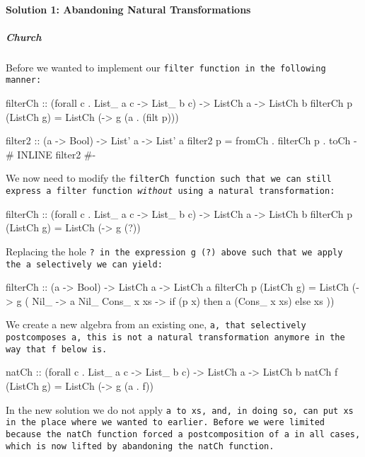 \paragraph{Solution 1: Abandoning Natural Transformations}
\subparagraph{Church} Before we wanted to implement our \tt{filter} function in the following manner:
\begin{spec}
filterCh :: (forall c . List_ a c -> List_ b c) -> ListCh a -> ListCh b
filterCh p (ListCh g) = ListCh (\a -> g (a . (filt p)))
\end{spec}
\begin{code}
filter2 :: (a -> Bool) -> List' a -> List' a
filter2 p = fromCh . filterCh p . toCh
{-# INLINE filter2 #-}
\end{code}
We now need to modify the \tt{filterCh} function such that we can still express a filter function \textit{without} using a natural transformation:
\begin{spec}
filterCh :: (forall c . List_ a c -> List_ b c) -> ListCh a -> ListCh b
filterCh p (ListCh g) = ListCh (\a -> g (?))
\end{spec}
Replacing the hole \tt{?} in the expression \tt{g (?)} above such that we apply the \tt{a} selectively we can yield:
\begin{code}
filterCh :: (a -> Bool) -> ListCh a -> ListCh a
filterCh p (ListCh g) = ListCh (\a -> g (\case
    Nil_ -> a Nil_
    Cons_ x xs -> if (p x) then a (Cons_ x xs) else xs
  ))
\end{code}
We create a new algebra from an existing one, \tt{a}, that selectively postcomposes \tt{a}, this is not a natural transformation anymore in the way that \tt{f} below is.
\begin{spec}
natCh :: (forall c . List_ a c -> List_ b c) -> ListCh a -> ListCh b
natCh f (ListCh g) = ListCh (\a -> g (a . f))
\end{spec}
In the new solution we do not apply \tt{a} to \tt{xs}, and, in doing so, can put \tt{xs} in the place where we wanted to earlier.
Before we were limited because the \tt{natCh} function forced a postcomposition of \tt{a} in all cases, which is now lifted by abandoning the \tt{natCh} function.



